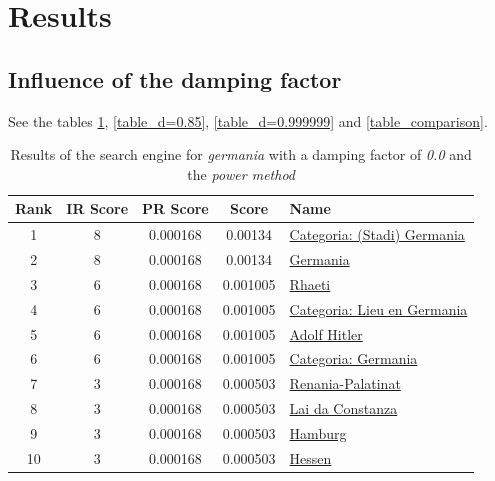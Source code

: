 \documentclass[pdftex,12pt,a4paper]{article}
\begin{document}
\section{Results}

\subsection{Influence of the damping factor}

See the tables \ref{table_d=0.0}, \ref{table_d=0.85}, \ref{table_d=0.999999} and \ref{table_comparison}.

\begin{table}[H]
\centering
\begin{tabular}{ | c | c | c | c | l | }
\hline
Rank & IR Score & PR Score &  Score & Name \\ \hline
1 & 8 & 0.000168 & 0.00134 & \href{http://rm.wikipedia.org/wiki/Categoria:(Stadi)_Germania}{Categoria: (Stadi) Germania} \\ \hline
2 & 8 & 0.000168 & 0.00134 & \href{http://rm.wikipedia.org/wiki/Germania}{Germania} \\ \hline
3 & 6 & 0.000168 & 0.001005 & \href{http://rm.wikipedia.org/wiki/Rhaeti}{Rhaeti} \\ \hline
4 & 6 & 0.000168 & 0.001005 & \href{http://rm.wikipedia.org/wiki/Categoria:Lieu_en_Germania}{Categoria: Lieu en Germania} \\ \hline
5 & 6 & 0.000168 & 0.001005 & \href{http://rm.wikipedia.org/wiki/Adolf_Hitler}{Adolf Hitler} \\ \hline
6 & 6 & 0.000168 & 0.001005 & \href{http://rm.wikipedia.org/wiki/Categoria:Germania}{Categoria: Germania} \\ \hline
7 & 3 & 0.000168 & 0.000503 & \href{http://rm.wikipedia.org/wiki/Renania-Palatinat}{Renania-Palatinat} \\ \hline
8 & 3 & 0.000168 & 0.000503 & \href{http://rm.wikipedia.org/wiki/Lai_da_Constanza}{Lai da Constanza} \\ \hline
9 & 3 & 0.000168 & 0.000503 & \href{http://rm.wikipedia.org/wiki/Hamburg}{Hamburg} \\ \hline
10 & 3 & 0.000168 & 0.000503 & \href{http://rm.wikipedia.org/wiki/Hessen}{Hessen} \\ \hline
\end{tabular}
\caption{Results of the search engine for \emph{germania} with a damping factor of \emph{0.0} and the \emph{power method}}
\label{table_d=0.0}
\end{table}
\end{document}
